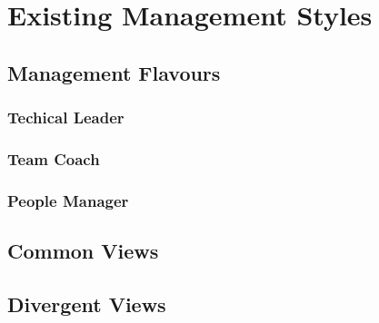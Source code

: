 \chapter{Existing Management Styles}
\label{chapter:existing}
\section{Management Flavours}
\label{sec:flavours}
\subsection{Techical Leader}
\label{sub-sec:tech-lead}
\subsection{Team Coach}
\label{sub-sec:team-coach}
\subsection{People Manager}
\label{sub-sec:pm}
\section{Common Views}
\label{sec:common}
\section{Divergent Views}
\label{sec:divergent}
